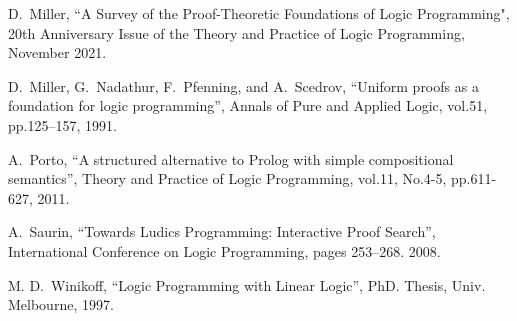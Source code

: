 \documentclass[letter]{ieice}
\begin{document}
\begin{thebibliography}{999}
 D.~Miller, ``A Survey of the Proof-Theoretic Foundations of Logic Programming",  
  20th Anniversary Issue of the Theory and Practice of Logic Programming, November 2021. 

D.~Miller, G.~Nadathur, F.~Pfenning, and A.~Scedrov, ``Uniform proofs as a
  foundation for logic programming'', Annals of Pure and Applied Logic, vol.51,
  pp.125--157, 1991.

A.~Porto,   ``A structured alternative to Prolog with simple compositional
               semantics'',
 Theory and Practice of Logic Programming, vol.11, No.4-5, pp.611-627, 2011.  


A.~Saurin, ``Towards {L}udics Programming: Interactive Proof Search'',  International Conference on
Logic Programming, pages 253--268.  2008.


M. D.~Winikoff, ``Logic Programming with Linear Logic'',  PhD. Thesis, 
Univ. Melbourne,
   1997.

\end{thebibliography}
\end{document}
